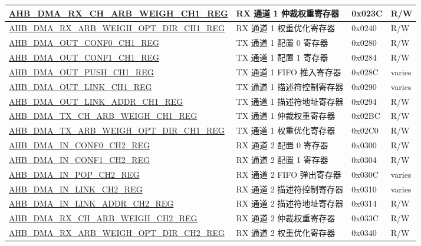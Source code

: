\begin{longtable}{ | l | l | p{1.3cm} | l | }
\hyperref[regdesc:AHBDMARXCHARBWEIGHCHNREG]{AHB\_DMA\_RX\_CH\_ARB\_WEIGH\_CH1\_REG} & RX 通道 1 仲裁权重寄存器 & 0x023C & R/W    \\ \hline
\hyperref[regdesc:AHBDMARXARBWEIGHOPTDIRCHNREG]{AHB\_DMA\_RX\_ARB\_WEIGH\_OPT\_DIR\_CH1\_REG} & RX 通道 1 权重优化寄存器 & 0x0240 & R/W    \\ \hline
\hyperref[regdesc:AHBDMAOUTCONF0CHNREG]{AHB\_DMA\_OUT\_CONF0\_CH1\_REG} & TX 通道 1 配置 0 寄存器 & 0x0280 & R/W    \\ \hline
\hyperref[regdesc:AHBDMAOUTCONF1CHNREG]{AHB\_DMA\_OUT\_CONF1\_CH1\_REG} & TX 通道 1 配置 1 寄存器 & 0x0284 & R/W    \\ \hline
\hyperref[regdesc:AHBDMAOUTPUSHCHNREG]{AHB\_DMA\_OUT\_PUSH\_CH1\_REG} & TX 通道 1 FIFO 推入寄存器 & 0x028C & varies    \\ \hline
\hyperref[regdesc:AHBDMAOUTLINKCHNREG]{AHB\_DMA\_OUT\_LINK\_CH1\_REG} & TX 通道 1 描述符控制寄存器 & 0x0290 & varies    \\ \hline
\hyperref[regdesc:AHBDMAOUTLINKADDRCHNREG]{AHB\_DMA\_OUT\_LINK\_ADDR\_CH1\_REG} & TX 通道 1 描述符地址寄存器 & 0x0294 & R/W    \\ \hline
\hyperref[regdesc:AHBDMATXCHARBWEIGHCHNREG]{AHB\_DMA\_TX\_CH\_ARB\_WEIGH\_CH1\_REG} & TX 通道 1 仲裁权重寄存器 & 0x02BC & R/W    \\ \hline
\hyperref[regdesc:AHBDMATXARBWEIGHOPTDIRCHNREG]{AHB\_DMA\_TX\_ARB\_WEIGH\_OPT\_DIR\_CH1\_REG} & TX 通道 1 权重优化寄存器 & 0x02C0 & R/W    \\ \hline
\hyperref[regdesc:AHBDMAINCONF0CHNREG]{AHB\_DMA\_IN\_CONF0\_CH2\_REG} & RX 通道 2 配置 0 寄存器 & 0x0300 & R/W    \\ \hline
\hyperref[regdesc:AHBDMAINCONF1CHNREG]{AHB\_DMA\_IN\_CONF1\_CH2\_REG} & RX 通道 2 配置 1 寄存器 & 0x0304 & R/W    \\ \hline
\hyperref[regdesc:AHBDMAINPOPCHNREG]{AHB\_DMA\_IN\_POP\_CH2\_REG} & RX 通道 2 FIFO 弹出寄存器 & 0x030C & varies    \\ \hline
\hyperref[regdesc:AHBDMAINLINKCHNREG]{AHB\_DMA\_IN\_LINK\_CH2\_REG} & RX 通道 2 描述符控制寄存器 & 0x0310 & varies    \\ \hline
\hyperref[regdesc:AHBDMAINLINKADDRCHNREG]{AHB\_DMA\_IN\_LINK\_ADDR\_CH2\_REG} & RX 通道 2 描述符地址寄存器 & 0x0314 & R/W    \\ \hline
\hyperref[regdesc:AHBDMARXCHARBWEIGHCHNREG]{AHB\_DMA\_RX\_CH\_ARB\_WEIGH\_CH2\_REG} & RX 通道 2 仲裁权重寄存器 & 0x033C & R/W    \\ \hline
\hyperref[regdesc:AHBDMARXARBWEIGHOPTDIRCHNREG]{AHB\_DMA\_RX\_ARB\_WEIGH\_OPT\_DIR\_CH2\_REG} & RX 通道 2 权重优化寄存器 & 0x0340 & R/W    \\ \hline

\end{longtable}
